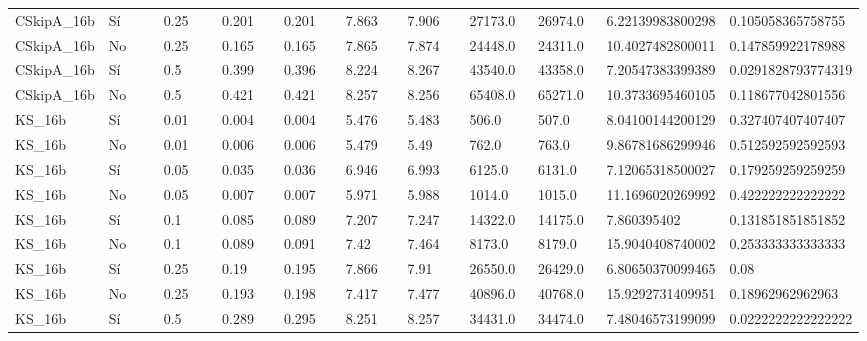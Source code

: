 {{\begin{longtable}{M{0.09\linewidth}M{0.09\linewidth}M{0.09\linewidth}M{0.09\linewidth}M{0.09\linewidth}M{0.09\linewidth}M{0.09\linewidth}M{0.09\linewidth}M{0.09\linewidth}M{0.09\linewidth}M{0.09\linewidth}}
CSkipA\_16b & Sí & \num{0.25} & \num{0.201} & \num{0.201} & \num{7.863} & \num{7.906} & \num{27173.0} & \num{26974.0} & \num{6.22139983800298} & \num{0.105058365758755} \\
CSkipA\_16b & No & \num{0.25} & \num{0.165} & \num{0.165} & \num{7.865} & \num{7.874} & \num{24448.0} & \num{24311.0} & \num{10.4027482800011} & \num{0.147859922178988} \\
CSkipA\_16b & Sí & \num{0.5} & \num{0.399} & \num{0.396} & \num{8.224} & \num{8.267} & \num{43540.0} & \num{43358.0} & \num{7.20547383399389} & \num{0.0291828793774319} \\
CSkipA\_16b & No & \num{0.5} & \num{0.421} & \num{0.421} & \num{8.257} & \num{8.256} & \num{65408.0} & \num{65271.0} & \num{10.3733695460105} & \num{0.118677042801556} \\
KS\_16b & Sí & \num{0.01} & \num{0.004} & \num{0.004} & \num{5.476} & \num{5.483} & \num{506.0} & \num{507.0} & \num{8.04100144200129} & \num{0.327407407407407} \\
KS\_16b & No & \num{0.01} & \num{0.006} & \num{0.006} & \num{5.479} & \num{5.49} & \num{762.0} & \num{763.0} & \num{9.86781686299946} & \num{0.512592592592593} \\
KS\_16b & Sí & \num{0.05} & \num{0.035} & \num{0.036} & \num{6.946} & \num{6.993} & \num{6125.0} & \num{6131.0} & \num{7.12065318500027} & \num{0.179259259259259} \\
KS\_16b & No & \num{0.05} & \num{0.007} & \num{0.007} & \num{5.971} & \num{5.988} & \num{1014.0} & \num{1015.0} & \num{11.1696020269992} & \num{0.422222222222222} \\
KS\_16b & Sí & \num{0.1} & \num{0.085} & \num{0.089} & \num{7.207} & \num{7.247} & \num{14322.0} & \num{14175.0} & \num{7.860395402} & \num{0.131851851851852} \\
KS\_16b & No & \num{0.1} & \num{0.089} & \num{0.091} & \num{7.42} & \num{7.464} & \num{8173.0} & \num{8179.0} & \num{15.9040408740002} & \num{0.253333333333333} \\
KS\_16b & Sí & \num{0.25} & \num{0.19} & \num{0.195} & \num{7.866} & \num{7.91} & \num{26550.0} & \num{26429.0} & \num{6.80650370099465} & \num{0.08} \\
KS\_16b & No & \num{0.25} & \num{0.193} & \num{0.198} & \num{7.417} & \num{7.477} & \num{40896.0} & \num{40768.0} & \num{15.9292731409951} & \num{0.18962962962963} \\
KS\_16b & Sí & \num{0.5} & \num{0.289} & \num{0.295} & \num{8.251} & \num{8.257} & \num{34431.0} & \num{34474.0} & \num{7.48046573199099} & \num{0.0222222222222222} \\

\end{longtable}}}
